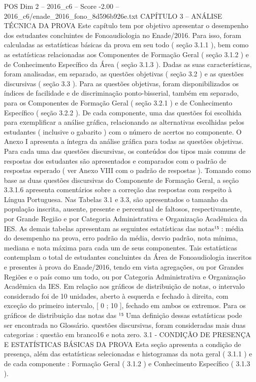 \begin{textsample}{POS Dim 2 – 2016\_c6 – Score -2.00 – 2016\_c6/enade\_2016\_fono\_8d596b926e.txt}  \label{ex:f2_pos_214}
CAPÍTULO 3 – ANÁLISE TÉCNICA DA PROVA Este capítulo tem por objetivo apresentar o desempenho dos estudantes concluintes de Fonoaudiologia no Enade/2016.
Para isso, foram calculadas as estatísticas básicas da prova em seu todo ( seção 3.1.1 ), bem como as estatísticas relacionadas aos Componentes de Formação Geral ( seção 3.1.2 ) e de Conhecimento Específico da Área ( seção 3.1.3 ).
Dadas as suas características, foram analisadas, em separado, as questões objetivas ( seção 3.2 ) e as questões discursivas ( seção 3.3 ).
Para as questões objetivas, foram disponibilizados os índices de facilidade e de discriminação ponto-bisserial, também em separado, para os Componentes de Formação Geral ( seção 3.2.1 ) e de Conhecimento Específico ( seção 3.2.2 ).
De cada componente, uma das questões foi escolhida para exemplificar a análise gráfica, relacionando as alternativas escolhidas pelos estudantes ( inclusive o gabarito ) com o número de acertos no componente.
O Anexo I apresenta a íntegra da análise gráfica para todas as questões objetivas.
Para cada uma das questões discursivas, os conteúdos dos tipos mais comuns de respostas dos estudantes são apresentados e comparados com o padrão de respostas esperado ( ver Anexo VIII com o padrão de respostas ).
Tomando como base as duas questões discursivas do Componente de Formação Geral, a seção 3.3.1.6 apresenta comentários sobre a correção das respostas com respeito à Língua Portuguesa.
Nas Tabelas 3.1 e 3.3, são apresentados o tamanho da população inscrita, ausente, presente e percentual de faltosos, respectivamente, por Grande Região e por Categoria Administrativa e Organização Acadêmica da IES.
As demais tabelas apresentam as seguintes estatísticas das notas¹⁵ : média do desempenho na prova, erro padrão da média, desvio padrão, nota mínima, mediana e nota máxima para cada um de seus componentes.
Tais estatísticas contemplam o total de estudantes concluintes da Área de Fonoaudiologia inscritos e presentes à prova do Enade/2016, tendo em vista agregações, ou por Grandes Regiões e o país como um todo, ou por Categoria Administrativa e Organização Acadêmica da IES.
Em relação aos gráficos de distribuição de notas, o intervalo considerado foi de 10 unidades, aberto à esquerda e fechado à direita, com exceção do primeiro intervalo, [ 0 ; 10 ], fechado em ambos os extremos.
Para os gráficos de distribuição das notas das ¹⁵ Uma definição dessas estatísticas pode ser encontrada no Glossário. questões discursivas, foram consideradas mais duas categorias : questão em branco16 e nota zero. 3.1 - CONDIÇÃO DE PRESENÇA E ESTATÍSTICAS BÁSICAS DA PROVA Esta seção apresenta a condição de presença, além das estatísticas selecionadas e histogramas da nota geral ( 3.1.1 ) e de cada componente : Formação Geral ( 3.1.2 ) e Conhecimento Específico ( 3.1.3 ).

\end{textsample}
